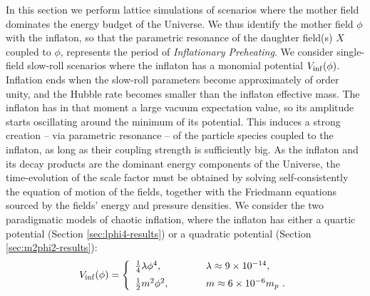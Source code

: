 \documentclass[a4paper,11pt]{article}
\newcommand{\bea}{\begin{eqnarray}}
\newcommand{\eea}{\end{eqnarray}}
\begin{document}
In this section we perform lattice simulations of scenarios where the mother field dominates the energy budget of the Universe. We thus identify the mother field $\phi$ with the inflaton, so that the parametric resonance of the daughter field(s) $X$ coupled to $\phi$, represents the period of {\it Inflationary Preheating}. We consider single-field slow-roll scenarios where the inflaton has a monomial potential $V_{\rm inf} (\phi)$. Inflation ends when the slow-roll parameters become approximately of order unity, and the Hubble rate becomes smaller than the inflaton effective mass. The inflaton has in that moment a large vacuum expectation value, so its amplitude starts oscillating around the minimum of its potential. This induces a strong creation -- via parametric resonance -- of the particle species coupled to the inflaton, as long as their coupling strength is sufficiently big. As the inflaton and its decay products are the dominant energy components of the Universe, the time-evolution of the scale factor must be obtained by solving self-consistently the equation of motion of the fields, together with the Friedmann equations sourced by the fields' energy and pressure densities. We consider the two paradigmatic models of chaotic inflation, where the inflaton has either a quartic potential (Section \ref{sec:lphi4-results}) or a quadratic potential (Section \ref{sec:m2phi2-results}):
    \bea
     V_{\rm inf} (\phi) = \left\{ \begin{array}{ll}
        \frac{1}{4} \lambda \phi^4  , \hspace{1cm} & \lambda \approx 9 \times 10^{-14} , \vspace*{2mm}\\ 
         \frac{1}{2} m^2 \phi^2 , \hspace{1cm} & m \approx 6 \times 10^{-6} m_p \ .
        \end{array} \right. \label{eq:inflation-potentials}
    \eea
\end{document}
